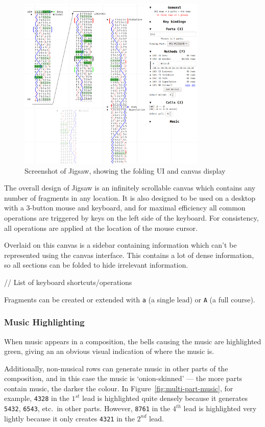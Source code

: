 \documentclass[12pt]{article}
\newcommand{\row}[1]{\texttt{#1}}
\begin{document}
\begin{figure}
    \centering
    \includegraphics[width=0.8\textwidth]{current-screenshot-w-mute}
    \caption{Screenshot of Jigsaw, showing the folding UI and canvas display}\label{fig:cur-screenshot}
\end{figure}

The overall design of Jigsaw is an infinitely scrollable canvas which contains any number of
fragments in any location.  It is also designed to be used on a desktop with a 3-button mouse and
keyboard, and for maximal efficiency all common operations are triggered by keys on the left side of
the keyboard.  For consistency, all operations are applied at the location of the mouse cursor.

Overlaid on this canvas is a sidebar containing information which can't be represented using the
canvas interface.  This contains a lot of dense information, so all sections can be folded to hide
irrelevant information.

// List of keyboard shortcuts/operations

Fragments can be created or extended with \verb|a| (a single lead) or \verb|A| (a full course).

\subsubsection{Music Highlighting}

When music appears in a composition, the bells causing the music are highlighted green, giving an
an obvious visual indication of where the music is.

Additionally, non-musical rows can generate music in other parts of the composition, and in this
case the music is `onion-skinned' --- the more parts contain music, the darker the colour.  In
Figure~\ref{fig:multi-part-music}, for example, \row{4328} in the $1^{st}$ lead is highlighted quite
densely because it generates \row{5432}, \row{6543}, etc.\ in other parts.  However, \row{8761} in
the $4^{th}$ lead is highlighted very lightly because it only creates \row{4321} in the $2^{nd}$
lead.
\end{document}
